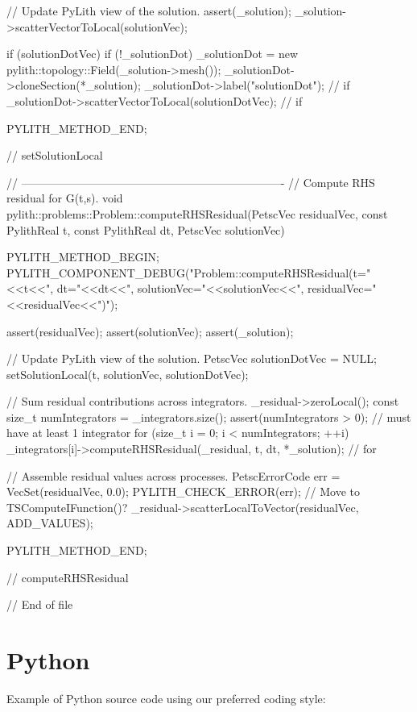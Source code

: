 \begin{cplusplus}
{    // Update PyLith view of the solution.
    assert(_solution);
    _solution->scatterVectorToLocal(solutionVec);

    if (solutionDotVec) {
        if (!_solutionDot) {
            _solutionDot = new pylith::topology::Field(_solution->mesh());
            _solutionDot->cloneSection(*_solution);
            _solutionDot->label("solutionDot");
        } // if
        _solutionDot->scatterVectorToLocal(solutionDotVec);
    } // if

    PYLITH_METHOD_END;
} // setSolutionLocal

// ----------------------------------------------------------------------
// Compute RHS residual for G(t,s).
void
pylith::problems::Problem::computeRHSResidual(PetscVec residualVec,
                                              const PylithReal t,
                                              const PylithReal dt,
                                              PetscVec solutionVec) {
    PYLITH_METHOD_BEGIN;
    PYLITH_COMPONENT_DEBUG("Problem::computeRHSResidual(t="<<t<<", dt="<<dt<<", solutionVec="<<solutionVec<<", residualVec="<<residualVec<<")");

    assert(residualVec);
    assert(solutionVec);
    assert(_solution);

    // Update PyLith view of the solution.
    PetscVec solutionDotVec = NULL;
    setSolutionLocal(t, solutionVec, solutionDotVec);

    // Sum residual contributions across integrators.
    _residual->zeroLocal();
    const size_t numIntegrators = _integrators.size();
    assert(numIntegrators > 0); // must have at least 1 integrator
    for (size_t i = 0; i < numIntegrators; ++i) {
        _integrators[i]->computeRHSResidual(_residual, t, dt, *_solution);
    } // for

    // Assemble residual values across processes.
    PetscErrorCode err = VecSet(residualVec, 0.0); PYLITH_CHECK_ERROR(err); // Move to TSComputeIFunction()?
    _residual->scatterLocalToVector(residualVec, ADD_VALUES);

    PYLITH_METHOD_END;
} // computeRHSResidual

// End of file
  
\end{cplusplus}


\section{Python}

Example of Python source code using our preferred coding style:

